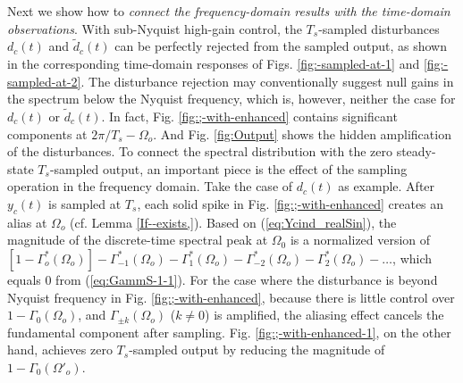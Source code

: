 \documentclass [11pt, proquest] {uwthesis}[2020/02/24]
\begin{document}
Next we show how to \emph{connect the frequency-domain results with
the time-domain observations}. With sub-Nyquist high-gain control,
the $T_{s}$-sampled disturbances $d_{c}(t)$ and $\tilde{d}_{c}(t)$
can be perfectly rejected from the sampled output, as shown in the
corresponding time-domain responses of Figs. \ref{fig:-sampled-at-1}
and \ref{fig:-sampled-at-2}. The disturbance rejection may conventionally
suggest null gains in the spectrum below the Nyquist frequency, which
is, however, neither the case for $d_{c}(t)$ or $\tilde{d}_{c}(t)$.
In fact, Fig. \ref{fig:;-with-enhanced} contains significant components
at $2\pi/T_{s}-\Omega_{o}$. And Fig. \ref{fig:Output} shows the
hidden amplification of the disturbances. To connect the spectral
distribution with the zero steady-state $T_{s}$-sampled output, an
important piece is the effect of the sampling operation in the frequency
domain. Take the case of $d_{c}(t)$ as example. After $y_{c}(t)$
is sampled at $T_{s}$, each solid spike in Fig. \ref{fig:;-with-enhanced}
creates an alias at $\Omega_{o}$ (cf. Lemma \ref{If--exists,}).
Based on (\ref{eq:Ycind_realSin}), the magnitude of the discrete-time
spectral peak at $\Omega_{0}$ is a normalized version of $[1-\Gamma_{o}^{*}(\Omega_{o})]-\Gamma_{-1}^{*}(\Omega_{o})-\Gamma_{1}^{*}(\Omega_{o})-\Gamma_{-2}^{*}(\Omega_{o})-\Gamma_{2}^{*}(\Omega_{o})-\dots$,
which equals 0 from (\ref{eq:GammS-1-1}). For the case where the
disturbance is beyond Nyquist frequency in Fig. \ref{fig:;-with-enhanced},
because there is little control over $1-\Gamma_{0}(\Omega_{o})$,
and $\Gamma_{\pm k}(\Omega_{o})$ ($k\neq0$) is amplified, the aliasing
effect cancels the fundamental component after sampling. Fig. \ref{fig:;-with-enhanced-1},
on the other hand, achieves zero $T_{s}$-sampled output by reducing
the magnitude of $1-\Gamma_{0}(\Omega'_{o})$.
\end{document}
